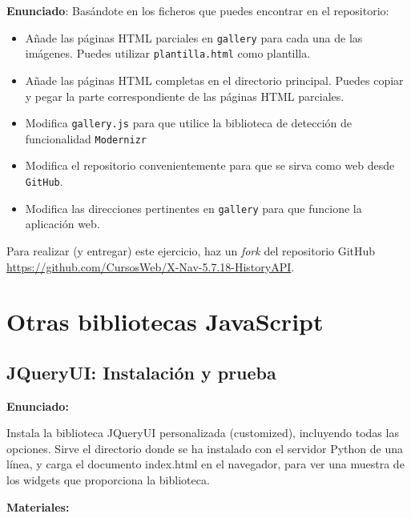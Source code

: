 \textbf{Enunciado}: Basándote en los ficheros que puedes encontrar en el repositorio:

\begin{itemize}
  \item Añade las páginas HTML parciales en \texttt{gallery} para cada una de las imágenes. Puedes utilizar \texttt{plantilla.html} como plantilla.
  \item Añade las páginas HTML completas en el directorio principal. Puedes copiar y pegar la parte correspondiente de las páginas HTML parciales.
    \item Modifica \texttt{gallery.js} para que utilice la biblioteca de detección de funcionalidad \texttt{Modernizr}
    \item Modifica el repositorio convenientemente para que se sirva como web desde \texttt{GitHub}.
    \item Modifica las direcciones pertinentes en \texttt{gallery} para que funcione la aplicación web.
\end{itemize}

Para realizar (y entregar) este ejercicio, haz un \emph{fork} del repositorio GitHub \url{https://github.com/CursosWeb/X-Nav-5.7.18-HistoryAPI}.


\section{Otras bibliotecas JavaScript}

\subsection{JQueryUI: Instalación y prueba}
\label{subsec:otras-jquery-instal}

\textbf{Enunciado:}

Instala la biblioteca JQueryUI personalizada (customized), incluyendo todas las opciones. Sirve el directorio donde se ha instalado con el servidor Python de una línea, y carga el documento index.html en el navegador, para ver una muestra de los widgets que proporciona la biblioteca.

\textbf{Materiales:}

